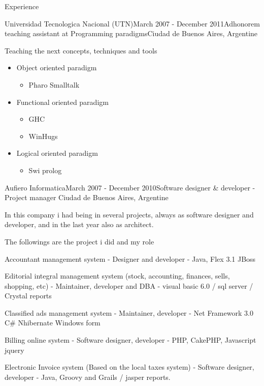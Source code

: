 \documentclass{resume} %
\begin{document}
\begin{rSection}{Experience}
\begin{rSubsection}{Universidad Tecnologica Nacional (UTN)}{March 2007 - December 2011}{Adhonorem teaching assistant at Programming paradigms}{Ciudad de Buenos Aires, Argentine}
\item Teaching the next concepts, techniques and tools
\begin{itemize}
	\item Object oriented paradigm
	\begin{itemize}
		\item Pharo Smalltalk
	\end{itemize}
	\item Functional oriented paradigm
	\begin{itemize}
		\item GHC
		\item WinHugs
	\end{itemize}
	\item Logical oriented paradigm 
	\begin{itemize}
		\item  Swi prolog
	\end{itemize}
\end{itemize}
\end{rSubsection}






\begin{rSubsection}{Aufiero Informatica}{March 2007 - December 2010}{Software designer \& developer - Project manager }{Ciudad de Buenos Aires, Argentine}
\item In this company i had being in several projects, always as software designer and developer, and in the last year also as architect. 
\item The followings are the project i did and my role
\item Accountant management system - Designer and developer - Java, Flex 3.1 JBoss
\item Editorial integral management system (stock, accounting, finances, sells, shopping, etc) - Maintainer, developer and DBA - visual basic 6.0 / sql server / Crystal reports 
\item Classified ads management system - Maintainer, developer  - Net Framework 3.0 C\# Nhibernate Windows form
\item Billing online system - Software designer, developer - PHP, CakePHP, Javascript jquery
\item Electronic Invoice system (Based on the local taxes system)  -  Software designer, developer - Java, Groovy and Grails / jasper reports.
\end{rSubsection}



\end{rSection}
\end{document}
